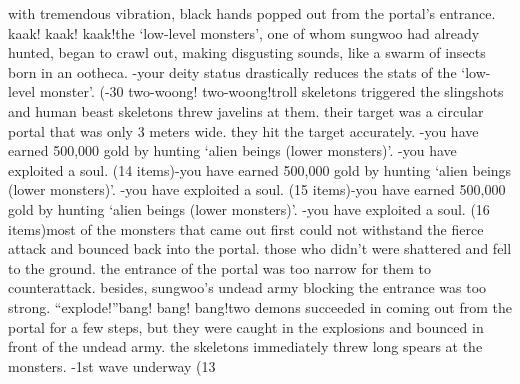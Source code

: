 with tremendous vibration, black hands popped out from the portal’s entrance.
kaak! kaak! kaak!the ‘low-level monsters’, one of whom sungwoo had already hunted, began to crawl out, making disgusting sounds, like a swarm of insects born in an ootheca.
-your deity status drastically reduces the stats of the ‘low-level monster’.
 (-30%
two-woong! two-woong!troll skeletons triggered the slingshots and human beast skeletons threw javelins at them.
 their target was a circular portal that was only 3 meters wide.
 they hit the target accurately.
-you have earned 500,000 gold by hunting ‘alien beings (lower monsters)’.
-you have exploited a soul.
 (14 items)-you have earned 500,000 gold by hunting ‘alien beings (lower monsters)’.
-you have exploited a soul.
 (15 items)-you have earned 500,000 gold by hunting ‘alien beings (lower monsters)’.
-you have exploited a soul.
 (16 items)most of the monsters that came out first could not withstand the fierce attack and bounced back into the portal.
 those who didn’t were shattered and fell to the ground.
the entrance of the portal was too narrow for them to counterattack.
 besides, sungwoo’s undead army blocking the entrance was too strong.
“explode!”bang! bang! bang!two demons succeeded in coming out from the portal for a few steps, but they were caught in the explosions and bounced in front of the undead army.
 the skeletons immediately threw long spears at the monsters.
-1st wave underway (13%

 